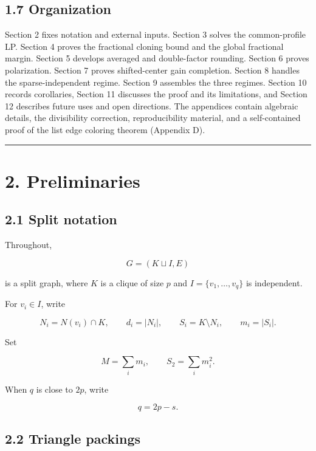 \documentclass[
  11pt,
]{article}
\begin{document}
\subsection{1.7 Organization}\label{organization}

Section 2 fixes notation and external inputs. Section 3 solves the
common-profile LP. Section 4 proves the fractional cloning bound and the
global fractional margin. Section 5 develops averaged and double-factor
rounding. Section 6 proves polarization. Section 7 proves shifted-center
gain completion. Section 8 handles the sparse-independent regime.
Section 9 assembles the three regimes. Section 10 records corollaries,
Section 11 discusses the proof and its limitations, and Section 12
describes future uses and open directions. The appendices contain
algebraic details, the divisibility correction, reproducibility
material, and a self-contained proof of the list edge coloring theorem
(Appendix D).

\begin{center}\rule{0.5\linewidth}{0.5pt}\end{center}

\section{2. Preliminaries}\label{preliminaries}

\subsection{2.1 Split notation}\label{split-notation}

Throughout,

\[
G=(K\sqcup I,E)
\]

is a split graph, where \(K\) is a clique of size \(p\) and
\(I=\{v_1,\ldots,v_q\}\) is independent.

For \(v_i\in I\), write

\[
N_i=N(v_i)\cap K,
\qquad
d_i=|N_i|,
\qquad
S_i=K\setminus N_i,
\qquad
m_i=|S_i|.
\]

Set

\[
M=\sum_i m_i,
\qquad
S_2=\sum_i m_i^2.
\]

When \(q\) is close to \(2p\), write

\[
q=2p-s.
\tag{2.1}
\]

\subsection{2.2 Triangle packings}\label{triangle-packings}
\end{document}
